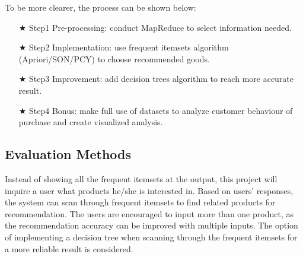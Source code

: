 \documentclass[sigconf,authordraft]{acmart}
\begin{document}
\noindent To be more clearer, the process can be shown below:
\begin{itemize}
\item[$\bigstar$] Step1 Pre-processing: conduct MapReduce to select information needed.
\item[$\bigstar$] Step2 Implementation: use frequent itemsets algorithm\\
(Apriori/SON/PCY) to choose recommended goods.
\item[$\bigstar$] Step3 Improvement: add decision trees algorithm to reach more accurate result.
\item[$\bigstar$] Step4 Bonus: make full use of datasets to analyze customer behaviour of purchase and create visualized analysis.
\end{itemize}
\subsection{Evaluation Methods}
Instead of showing all the frequent itemsets at the output, this project will inquire a user what products he/she is interested in. Based on users' responses, the system can scan through frequent itemsets to find related products for recommendation. The users are encouraged to input more than one product, as the recommendation accuracy can be improved with multiple inputs. The option of implementing a decision tree when scanning through the frequent itemsets for a more reliable result is considered.
\end{document}
